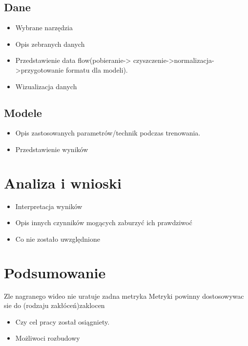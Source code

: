 \section{Dane}
\label{cha:pierwszyDokument}

\begin{itemize}
\item Wybrane narzędzia
\item Opis zebranych danych
\item Przedstawienie data flow(pobieranie-> czyszczenie->normalizacja->przygotowanie formatu dla modeli).
\item Wizualizacja danych
\end{itemize}





\section{Modele }
\label{cha:pierwszyDokument}

\begin{itemize}
\item Opis zastosowanych parametrów/technik podczas trenowania.
\item Przedstawienie wyników 
\end{itemize}


\chapter{Analiza i wnioski }
\label{cha:pierwszyDokument}

\begin{itemize}
\item Interpretacja wyników
\item Opis innych czynników mogących zaburzyć ich prawdziwoć
\item Co nie zostało uwzględnione 
\end{itemize}


\chapter{Podsumowanie}
Zle nagranego wideo nie uratuje zadna metryka
Metryki powinny dostosowywac sie do (rodzaju zakłóceń)zaklocen
\label{cha:pierwszyDokument}

\begin{itemize}
\item Czy cel pracy został osiągniety.
\item Możliwoci rozbudowy
\end{itemize}








